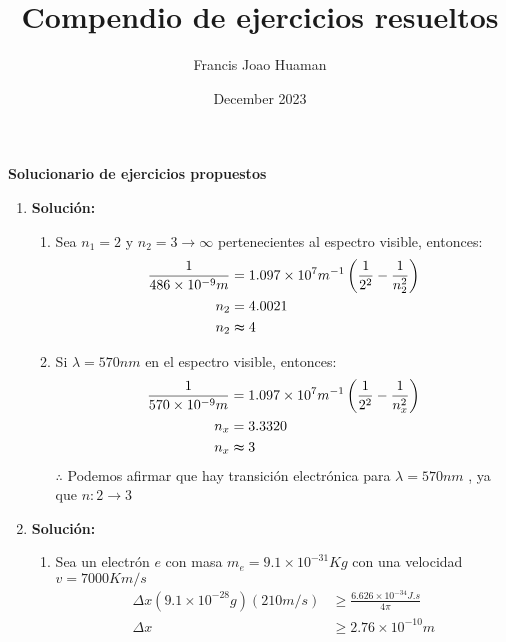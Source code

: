 \documentclass{article}
\title{Compendio de ejercicios resueltos}
\author{Francis Joao Huaman}
\date{December 2023}
\begin{document}



\begin{center}
    {\large \textbf{Solucionario de ejercicios propuestos}}
\end{center}


\begin{enumerate}
    \item 
    \textbf{Solución:}
    \begin{enumerate}
        \item 
        Sea $n_1 = 2$ y $n_2 = 3 \rightarrow \infty$ pertenecientes al espectro visible, entonces:
        \begin{equation*}
        \begin{split}
            \frac{1}{486 \times 10^{-9}m } &= 1.097 \times 10^{7}m^{-1} \left(\frac{1}{2^{2}} - \frac{1}{n_2^{2}}\right) \\
                n_2 &= 4.0021\\
                n_2 &\thickapprox 4 \\
        \end{split}
        \end{equation*}

        \item 
        Si $\lambda = 570nm$ en el espectro visible, entonces:
        \begin{equation*}
            \begin{split}
                \frac{1}{570 \times 10^{-9}m } &= 1.097 \times 10^{7}m^{-1} \left(\frac{1}{2^{2}} - \frac{1}{n_x^{2}}\right) \\
                n_x &= 3.3320\\
                n_x &\thickapprox 3 \\
            \end{split}
        \end{equation*}
        $\therefore$ Podemos afirmar que hay transici\'on electr\'onica para $\lambda = 570nm$ , ya que $n: 2 \rightarrow 3$
    \end{enumerate}


    \item 
    \textbf{Solución:}
    \begin{enumerate}
        \item 
        Sea un electr\'on $e$ con masa $m_e = 9.1 \times 10^{-31}Kg$ con una velocidad $v = 7000Km/s$ 
        \begin{equation*}
            \begin{split}
                \Delta x (9.1 \times 10^{-28}g) (210m/s) &\geqslant \frac{6.626 \times 10^{-34}J.s}{4\pi}\\
                \Delta x &\geqslant 2.76 \times 10^{-10}m
            \end{split}
        \end{equation*}    


\end{enumerate}
\end{enumerate}
\end{document}
